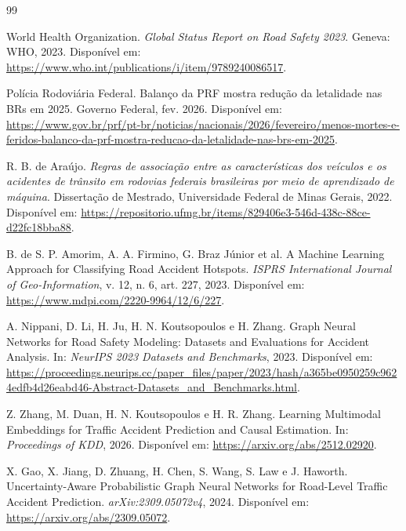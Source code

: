 \documentclass[12pt]{article}
\begin{document}
\begin{thebibliography}{99}

World Health Organization.
\newblock \textit{Global Status Report on Road Safety 2023}.
\newblock Geneva: WHO, 2023.
\newblock Disponível em:
\url{https://www.who.int/publications/i/item/9789240086517}.

Polícia Rodoviária Federal.
\newblock Balanço da PRF mostra redução da letalidade nas BRs em 2025.
\newblock Governo Federal, fev. 2026.
\newblock Disponível em:
\url{https://www.gov.br/prf/pt-br/noticias/nacionais/2026/fevereiro/menos-mortes-e-feridos-balanco-da-prf-mostra-reducao-da-letalidade-nas-brs-em-2025}.

R. B. de Araújo.
\newblock \textit{Regras de associação entre as características dos
veículos e os acidentes de trânsito em rodovias federais brasileiras
por meio de aprendizado de máquina}.
\newblock Dissertação de Mestrado, Universidade Federal de Minas
Gerais, 2022.
\newblock Disponível em:
\url{https://repositorio.ufmg.br/items/829406e3-546d-438c-88ce-d22fc18bba88}.

B. de S. P. Amorim, A. A. Firmino, G. Braz Júnior et al.
\newblock A Machine Learning Approach for Classifying Road Accident
Hotspots.
\newblock \textit{ISPRS International Journal of Geo-Information},
v. 12, n. 6, art. 227, 2023.
\newblock Disponível em:
\url{https://www.mdpi.com/2220-9964/12/6/227}.

A. Nippani, D. Li, H. Ju, H. N. Koutsopoulos e H. Zhang.
\newblock Graph Neural Networks for Road Safety Modeling: Datasets and
Evaluations for Accident Analysis.
\newblock In: \textit{NeurIPS 2023 Datasets and Benchmarks}, 2023.
\newblock Disponível em:
\url{https://proceedings.neurips.cc/paper_files/paper/2023/hash/a365be0950259c9624edfb4d26eabd46-Abstract-Datasets_and_Benchmarks.html}.

Z. Zhang, M. Duan, H. N. Koutsopoulos e H. R. Zhang.
\newblock Learning Multimodal Embeddings for Traffic Accident
Prediction and Causal Estimation.
\newblock In: \textit{Proceedings of KDD}, 2026.
\newblock Disponível em:
\url{https://arxiv.org/abs/2512.02920}.

X. Gao, X. Jiang, D. Zhuang, H. Chen, S. Wang, S. Law e J. Haworth.
\newblock Uncertainty-Aware Probabilistic Graph Neural Networks for
Road-Level Traffic Accident Prediction.
\newblock \textit{arXiv:2309.05072v4}, 2024.
\newblock Disponível em:
\url{https://arxiv.org/abs/2309.05072}.


\end{thebibliography}
\end{document}
